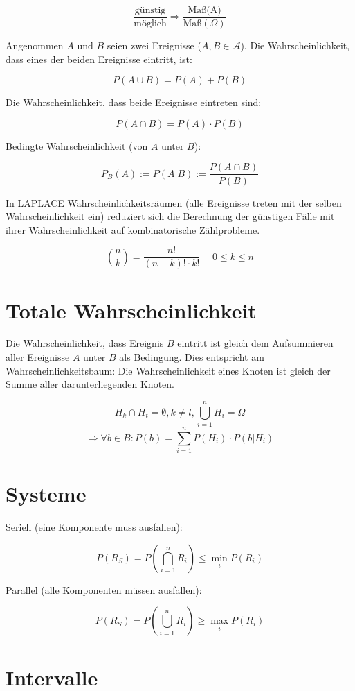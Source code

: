 \documentclass[a4paper,twocolumn]{article}
\begin{document}
\[
    \frac{\mbox{günstig}}{\mbox{möglich}} \Rightarrow
        \frac{\mbox{Maß(A)}}{\mbox{Maß}(\Omega)}
\]

Angenommen $A$ und $B$ seien zwei Ereignisse ($A, B \in \mathcal{A}$).
Die Wahrscheinlichkeit, dass eines der beiden Ereignisse eintritt, ist:

\[
    P(A\cup B) = P(A) + P(B)
\]

Die Wahrscheinlichkeit, dass beide Ereignisse eintreten sind:

\[
    P(A\cap B) = P(A)\cdot P(B)
\]

Bedingte Wahrscheinlichkeit (von $A$ unter $B$):

\[
    P_B(A) := P(A|B) := \frac{P(A\cap B)}{P(B)}
\]

In LAPLACE Wahrscheinlichkeitsräumen (alle Ereignisse treten mit der selben
Wahrscheinlichkeit ein) reduziert sich die Berechnung der
günstigen Fälle mit ihrer Wahrscheinlichkeit auf kombinatorische
Zählprobleme.

\[
    {n \choose k} = \frac{n!}{(n-k)!\cdot k!}
        \hspace{15pt} 0 \leq k \leq n
\]

\section{Totale Wahrscheinlichkeit}

Die Wahrscheinlichkeit, dass Ereignis $B$ eintritt ist gleich dem
Aufsummieren aller Ereignisse $A$ unter $B$ als Bedingung. Dies entspricht
am Wahrscheinlichkeitsbaum: Die Wahrscheinlichkeit eines Knoten ist gleich
der Summe aller darunterliegenden Knoten.

\[
    H_k \cap H_t = \emptyset, k \neq l, \bigcup_{i=1}^n H_i = \Omega
\] \[
    \Rightarrow \forall b \in B: P(b) = \sum_{i=1}^n P(H_i) \cdot P(b|H_i)
\]

\section{Systeme}

Seriell (eine Komponente muss ausfallen):

\[
    P(R_S) = P\left(\bigcap_{i=1}^n R_i\right) \leq \min_i P(R_i)
\]

Parallel (alle Komponenten müssen ausfallen):

\[
    P(R_S) = P\left(\bigcup_{i=1}^n R_i\right) \geq \max_i P(R_i)
\]

\section{Intervalle}
\end{document}
